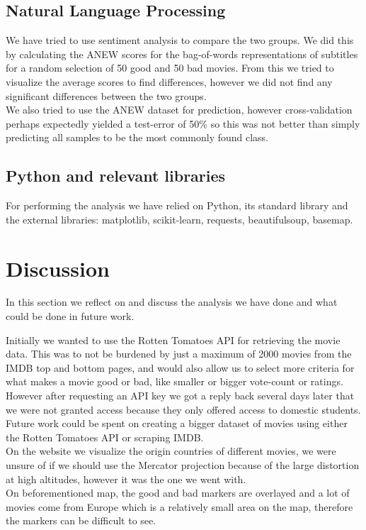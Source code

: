 \documentclass{acm_proc_article-sp}
\begin{document}
\subsection{Natural Language Processing}
We have tried to use sentiment analysis to compare the two groups. We did this by calculating the ANEW scores\cite{anew} for the bag-of-words representations of subtitles for a random selection of 50 good and 50 bad movies. From this we tried to visualize the average scores to find differences, however we did not find any significant differences between the two groups.\\
We also tried to use the ANEW dataset for prediction, however cross-validation perhaps expectedly yielded a test-error of 50\% so this was not better than simply predicting all samples to be the most commonly found class. \\
\subsection{Python and relevant libraries}
For performing the analysis we have relied on Python, its standard library and the external libraries: matplotlib, scikit-learn, requests, beautifulsoup, basemap.

\section{Discussion}
In this section we reflect on and discuss the analysis we have done and what could be done in future work.

Initially we wanted to use the Rotten Tomatoes API\cite{tomatoes} for retrieving the movie data. This was to not be burdened by just a maximum of 2000 movies from the IMDB top and bottom pages, and would also allow us to select more criteria for what makes a movie good or bad, like smaller or bigger vote-count or ratings. However after requesting an API key we got a reply back several days later that we were not granted access because they only offered access to domestic students. Future work could be spent on creating a bigger dataset of movies using either the Rotten Tomatoes API or scraping IMDB.\\

On the website we visualize the origin countries of different movies, we were unsure of if we should use the Mercator projection because of the large distortion at high altitudes, however it was the one we went with.\\ 
On beforementioned map, the good and bad markers are overlayed and a lot of movies come from Europe which is a relatively small area on the map, therefore the markers can be difficult to see.\\\
\end{document}
